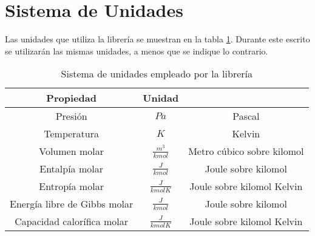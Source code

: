 \section{Sistema de Unidades}\label{sec:units}

Las unidades que utiliza la librería se muestran en la tabla \ref{tab:units}.
Durante este escrito se utilizarán las mismas unidades, a menos que se indique lo contrario.


\begin{table}[!h]
	\centering
	\caption{Sistema de unidades empleado por la librería}\label{tab:units}
	\begin{tabular}{ |c| c|c|}
		\hline
			Propiedad & Unidad &\\
		\hline
			Presión & $Pa$ & Pascal\\
			Temperatura & $K$ & Kelvin\\
			Volumen molar & $\frac{m^3}{kmol}$ & Metro cúbico sobre kilomol\\
			Entalpía molar & $\frac{J}{kmol}$ & Joule sobre kilomol\\
			Entropía molar & $\frac{J}{kmol K}$ & Joule sobre kilomol Kelvin\\
			Energía libre de Gibbs molar & $\frac{J}{kmol}$ & Joule sobre kilomol\\
			Capacidad calorífica molar & $\frac{J}{kmol K}$  & Joule sobre kilomol Kelvin\\
		\hline
	\end{tabular}
\end{table}